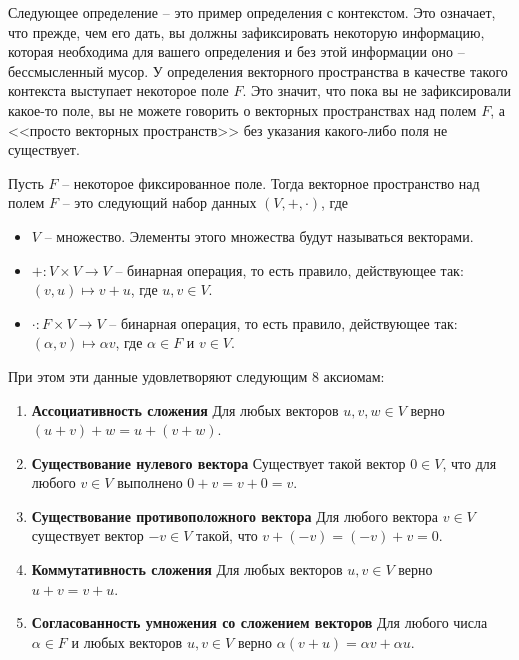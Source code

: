 Следующее определение -- это пример определения с контекстом.
Это означает, что прежде, чем его дать, вы должны зафиксировать некоторую информацию, которая необходима для вашего определения и без этой информации оно -- бессмысленный мусор.
У определения векторного пространства в качестве такого контекста выступает некоторое поле $F$.
Это значит, что пока вы не зафиксировали какое-то поле, вы не можете говорить о векторных пространствах над полем $F$, а <<просто векторных пространств>> без указания какого-либо поля не существует.

\begin{definition}
\label{def::VectorSpace}
Пусть $F$ -- некоторое фиксированное поле.
Тогда векторное пространство над полем $F$ -- это следующий набор данных $(V, +, \cdot)$, где
\begin{itemize}
\item $V$ -- множество.
Элементы этого множества будут называться векторами.

\item $+\colon V \times V \to V$ -- бинарная операция, то есть правило, действующее так: $(v,u)\mapsto v + u$, где $u,v \in V$.

\item $\cdot \colon F \times V \to V$ -- бинарная операция, то есть правило, действующее так: $(\alpha, v)\mapsto \alpha v$, где $\alpha \in F$ и $v\in V$.
\end{itemize}
При этом эти данные удовлетворяют следующим $8$ аксиомам:
\begin{enumerate}
\item {\bf Ассоциативность сложения} Для любых векторов $u,v,w\in V$ верно $(u+v) + w = u + (v+w)$.

\item {\bf Существование нулевого вектора} Существует такой вектор $0\in V$, что для любого $v\in V$ выполнено $0 + v = v + 0 = v$.

\item {\bf Существование противоположного вектора} Для любого вектора $v\in V$ существует вектор $-v\in V$ такой, что $v + (-v) = (-v) + v = 0$.

\item {\bf Коммутативность сложения} Для любых векторов $u,v \in V$ верно $u + v = v + u$.

\item {\bf Согласованность умножения со сложением векторов} Для любого числа $\alpha \in F$ и любых векторов $u,v \in V$ верно $\alpha(v + u) = \alpha v + \alpha u$.


\end{enumerate}
\end{definition}
